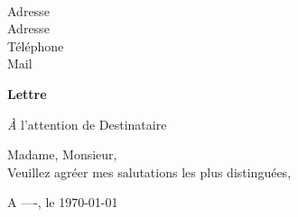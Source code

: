 % 
% 






\sffamily
\hfill
\begin{flushleft}
  \\[.35ex]
  \small
  Adresse\\
  Adresse\\[.35ex]
  Téléphone\\
  Mail
\end{flushleft}

\begin{center}
\Large \bfseries Lettre
\end{center}

\begin{flushright}
  {\textit À l'attention de Destinataire}\\[.35ex]
  \small\itshape
\end{flushright}
\hfill

Madame, Monsieur,\\

Veuillez agréer mes salutations les plus distinguées,\\

\hfill
\begin{flushright}
A ----, le \today \\
\end{flushright}


\vfill

